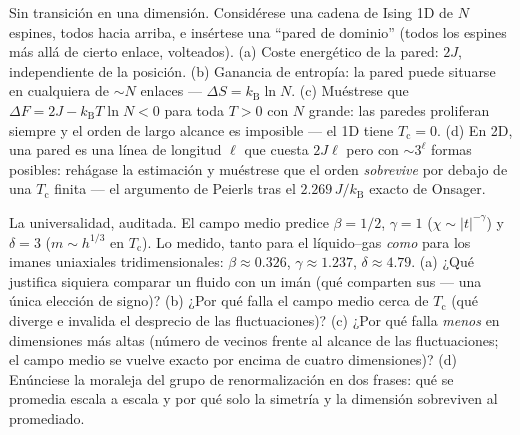 \begin{exercise}[$\star\star\star$]\label{exo:b3:phase-transitions:10}
Sin transición en una dimensión. Considérese una cadena de Ising 1D de $N$
espines, todos hacia arriba, e insértese una ``pared de dominio'' (todos los espines más allá de
cierto enlace, volteados). (a) Coste energético de la pared: $2J$,
independiente de la posición. (b) Ganancia de entropía: la pared puede situarse en
cualquiera de $\sim N$ enlaces --- $\Delta S = k_{\text{B}}\ln N$. (c)
Muéstrese que $\Delta F = 2J - k_{\text{B}}T\ln N < 0$ para toda $T > 0$ con
$N$ grande: las paredes proliferan siempre y el orden de largo alcance es
imposible --- el  1D tiene $T_{\text{c}} = 0$. (d) En
2D, una pared es una línea de longitud $\ell$ que cuesta $2J\ell$ pero con
$\sim3^\ell$ formas posibles: rehágase la estimación y muéstrese que el orden
\emph{sobrevive} por debajo de una $T_{\text{c}}$ finita --- el
argumento de Peierls tras el $2.269\,J/k_{\text{B}}$ exacto de Onsager.
\end{exercise}

\begin{exercise}[$\star\star\star$]\label{exo:b3:phase-transitions:11}
La universalidad, auditada. El campo medio predice $\beta = 1/2$, $\gamma
= 1$ ($\chi \sim |t|^{-\gamma}$) y $\delta = 3$ ($m \sim h^{1/3}$
en $T_{\text{c}}$). Lo medido, tanto para el 
líquido--gas \emph{como} para los imanes uniaxiales tridimensionales: $\beta
\approx 0.326$, $\gamma \approx 1.237$, $\delta \approx 4.79$.
(a) ¿Qué justifica siquiera comparar un fluido con un imán (qué
comparten sus  --- una única elección de signo)? (b)
¿Por qué falla el campo medio cerca de $T_{\text{c}}$ (qué diverge e
invalida el desprecio de las fluctuaciones)? (c) ¿Por qué falla
\emph{menos} en dimensiones más altas (número de vecinos frente al
alcance de las fluctuaciones; el campo medio se vuelve exacto por encima de cuatro
dimensiones)? (d) Enúnciese la moraleja del grupo de renormalización en dos
frases: qué se promedia escala a escala y por qué solo la
simetría y la dimensión sobreviven al promediado.
\end{exercise}

